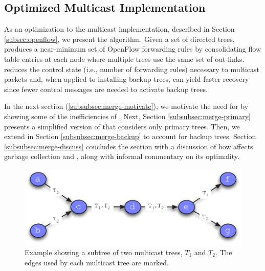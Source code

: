 
\subsection{Optimized Multicast Implementation}
\label{subsec:merge}

As an optimization to the \base multicast implementation, described in Section \ref{subsec:openflow}, we present the \merge algorithm.  
Given a set of directed trees, produces a near-minimum set of OpenFlow forwarding rules by
consolidating flow table entries at each node where multiple trees use the same set of out-links.  \merge reduces the control state (i.e., number of forwarding rules) necessary to 
multicast packets and, when applied to installing backup trees, can yield faster recovery since fewer control messages are needed to activate backup trees.




In the next section (\ref{subsubsec:merge-motivate}), we motivate the need for \merge by showing some of the inefficiencies of \bases.  Next, Section \ref{subsubsec:merge-primary} 
presents a simplified version of  \merge that considers only primary trees.  Then, we extend
\merge in Section \ref{subsubsec:merge-backup} to account for backup trees.  Section \ref{subsubsec:merge-discuss} concludes the section with a discussion of how \merge affects garbage
collection and \pcnts, along with informal commentary on its optimality.

\begin{figure}
  \centering
   \includegraphics[scale=0.55]{figs/merger-example.pdf}
\caption{Example showing a subtree of two multicast trees, $T_1$ and $T_2$.  The edges used by each multicast tree are marked.}
\label{fig:merger-example}
\end{figure}


